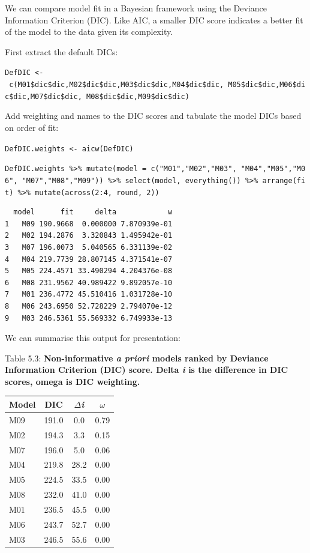 \documentclass[
]{book}
\begin{document}
We can compare model fit in a Bayesian framework using the Deviance Information Criterion (DIC). Like AIC, a smaller DIC score indicates a better fit of the model to the data given its complexity.

First extract the default DICs:

\texttt{DefDIC\ \textless{}-\ c(M01\$dic\$dic,M02\$dic\$dic,M03\$dic\$dic,M04\$dic\$dic,\ M05\$dic\$dic,M06\$dic\$dic,M07\$dic\$dic,\ M08\$dic\$dic,M09\$dic\$dic)}

Add weighting and names to the DIC scores and tabulate the model DICs based on order of fit:

\texttt{DefDIC.weights\ \textless{}-\ aicw(DefDIC)}

\texttt{DefDIC.weights\ \%\textgreater{}\%\ mutate(model\ =\ c("M01","M02","M03",\ "M04","M05","M06",\ "M07","M08","M09"))\ \%\textgreater{}\%\ select(model,\ everything())\ \%\textgreater{}\%\ arrange(fit)\ \%\textgreater{}\%\ mutate(across(2:4,\ round,\ 2))}

\begin{verbatim}
  model      fit     delta            w
1   M09 190.9668  0.000000 7.870939e-01
2   M02 194.2876  3.320843 1.495942e-01
3   M07 196.0073  5.040565 6.331139e-02
4   M04 219.7739 28.807145 4.371541e-07
5   M05 224.4571 33.490294 4.204376e-08
6   M08 231.9562 40.989422 9.892057e-10
7   M01 236.4772 45.510416 1.031728e-10
8   M06 243.6950 52.728229 2.794070e-12
9   M03 246.5361 55.569332 6.749933e-13
\end{verbatim}

We can summarise this output for presentation:

Table 5.3: \textbf{Non-informative \emph{a priori} models ranked by Deviance Information Criterion (DIC) score. Delta \emph{i} is the difference in DIC scores, omega is DIC weighting.}

\begin{longtable}[]{@{}lccc@{}}
\toprule
Model & DIC & \(\Delta\)\emph{i} & \(\omega\) \\
\midrule
\endhead
M09 & 191.0 & 0.0 & 0.79 \\
M02 & 194.3 & 3.3 & 0.15 \\
M07 & 196.0 & 5.0 & 0.06 \\
M04 & 219.8 & 28.2 & 0.00 \\
M05 & 224.5 & 33.5 & 0.00 \\
M08 & 232.0 & 41.0 & 0.00 \\
M01 & 236.5 & 45.5 & 0.00 \\
M06 & 243.7 & 52.7 & 0.00 \\
M03 & 246.5 & 55.6 & 0.00 \\
\bottomrule
\end{longtable}
\end{document}
